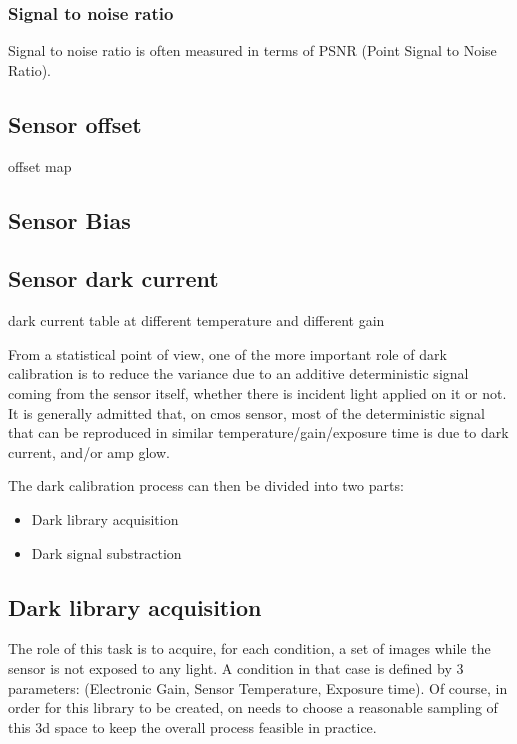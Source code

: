 \documentclass{article}
\begin{document}
    \subsubsection{Signal to noise ratio} Signal to noise ratio is often measured in terms of PSNR (Point Signal to Noise Ratio).

    
  \subsection{Sensor offset}
    offset map 
    
  \subsection{Sensor Bias}    
    
  \subsection{Sensor dark current}
    dark current table at different temperature and different gain
    
    From a statistical point of view, one of the more important role of dark calibration is to reduce the variance due to an additive deterministic signal coming from the sensor itself, whether there is incident light applied on it or not.
    It is generally admitted that, on cmos sensor, most of the deterministic signal that can be reproduced in similar temperature/gain/exposure time is due to dark current, and/or amp glow.
    
    The dark calibration process can then be divided into two parts:
    \begin{itemize}
     \item Dark library acquisition
     \item Dark signal substraction
    \end{itemize}

    \subsection{Dark library acquisition} The role of this task is to acquire, for each condition, a set of images while the sensor is not exposed to any light. A condition in that case is defined by 3 parameters: (Electronic Gain, Sensor Temperature, Exposure time).
    Of course, in order for this library to be created, on needs to choose a reasonable sampling of this 3d space to keep the overall process feasible in practice.
    
\end{document}

